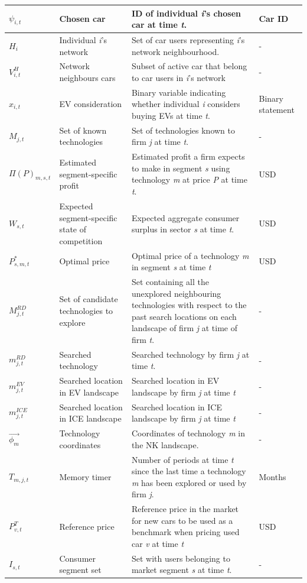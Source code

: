 \documentclass[12pt]{article}
\begin{document}
\begin{longtable}{p{}p{}p{}p{}}
		$\psi_{i,t}$ & Chosen car & ID of individual \textit{i}'s chosen car at time \textit{t}. & Car ID \\
		\hline
		$H_i$ & Individual \textit{i}'s network & Set of car users representing \textit{i}'s network neighbourhood. & - \\
		\hline
		$V^H_{i,t}$ & Network neighbours cars &  Subset of active car that belong to car users in \textit{i}'s network   & - \\
		\hline
		$x_{i,t}$ & EV consideration & Binary variable indicating whether individual \textit{i} considers buying EVs at time \textit{t}. & Binary statement \\
		\hline
		$M_{j,t}$ & Set of known technologies & Set of technologies known to firm \textit{j} at time \textit{t}. & - \\
		\hline
		$\Pi(P)_{m,s,t}$ & Estimated segment-specific profit & Estimated profit a firm expects to make in segment \textit{s} using technology \textit{m} at price \textit{P} at time \textit{t}. & USD \\
		\hline
		$W_{s,t}$ & Expected segment-specific state of competition & Expected aggregate consumer surplus in sector \textit{s} at time \textit{t}. & USD \\
		\hline
		$P^*_{s,m,t}$ & Optimal price & Optimal price of a technology \textit{m} in segment \textit{s} at time \textit{t} & USD \\
		\hline
		$M^{RD}_{j,t}$ & Set of candidate technologies to explore & Set containing all the unexplored neighbouring technologies with respect to the past search locations on each landscape of firm \textit{j} at time of firm \textit{t}. & - \\
		\hline
		$m^{RD}_{j,t}$ & Searched technology & Searched technology by firm \textit{j} at time \textit{t}. & - \\
		\hline
		$m^{EV}_{j,t}$ & Searched location in EV landscape & Searched location in EV landscape by firm \textit{j} at time \textit{t} & - \\
		\hline
		$m^{ICE}_{j,t}$ & Searched location in ICE landscape & Searched location in ICE landscape by firm \textit{j} at time \textit{t} & - \\
		\hline
		$\vec{\phi_{m}}$ & Technology coordinates & Coordinates of technology \textit{m} in the NK landscape. & - \\
		\hline
		$T_{m,j,t}$ & Memory timer & Number of periods at time \textit{t} since the last time a technology \textit{m} has been explored or used by firm \textit{j}. & Months \\
		\hline
		$P^T_{v,t}$ & Reference price & Reference price in the market for new cars to be used as a benchmark when pricing used car \textit{v} at time \textit{t} & USD \\
		\hline
		$I_{s,t}$ & Consumer segment set & Set with users belonging to market segment \textit{s} at time \textit{t}. & - \\
		\hline
	\end{longtable}
	
\end{document}
